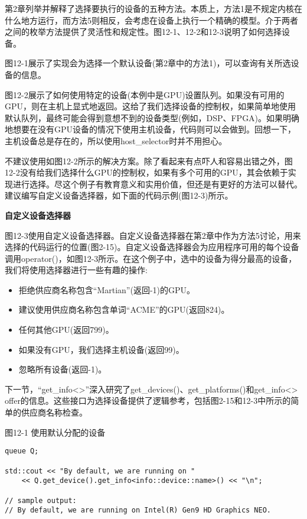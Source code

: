 第2章列举并解释了选择要执行的设备的五种方法。本质上，方法1是不规定内核在什么地方运行，而方法5则相反，会考虑在设备上执行一个精确的模型。介于两者之间的枚举方法提供了灵活性和规定性。图12-1、12-2和12-3说明了如何选择设备。\par

图12-1展示了实现会为选择一个默认设备(第2章中的方法1)，可以查询有关所选设备的信息。\par

图12-2展示了如何使用特定的设备(本例中是GPU)设置队列。如果没有可用的GPU，则在主机上显式地返回。这给了我们选择设备的控制权，如果简单地使用默认队列，最终可能会得到意想不到的设备类型(例如，DSP、FPGA)。如果明确地想要在没有GPU设备的情况下使用主机设备，代码则可以会做到。回想一下，主机设备总是存在的，所以使用host\_selector时并不用担心。\par

不建议使用如图12-2所示的解决方案。除了看起来有点吓人和容易出错之外，图12-2没有给我们选择什么GPU的控制权，如果有多个可用的GPU，其会依赖于实现进行选择。尽这个例子有教育意义和实用价值，但还是有更好的方法可以替代。建议编写自定义设备选择器，如下面的代码示例(图12-3)所示。\par

\hspace*{\fill} \par %
\textbf{自定义设备选择器}

图12-3使用自定义设备选择器。自定义设备选择器在第2章中作为方法5讨论，用来选择的代码运行的位置(图2-15)。自定义设备选择器会为应用程序可用的每个设备调用operator()，如图12-3所示。在这个例子中，选中的设备为得分最高的设备，我们将使用选择器进行一些有趣的操作:\par

\begin{itemize}
	\item 拒绝供应商名称包含“Martian”(返回-1)的GPU。
	\item 建议使用供应商名称包含单词“ACME”的GPU(返回824)。
	\item 任何其他GPU(返回799)。
	\item 如果没有GPU，我们选择主机设备(返回99)。
	\item 忽略所有设备(返回-1)。
\end{itemize}

下一节，“get\_info<>”深入研究了get\_devices()、get\_platforms()和get\_info<> offer的信息。这些接口为选择设备提供了逻辑参考，包括图2-15和12-3中所示的简单的供应商名称检查。\par

\hspace*{\fill} \par %
图12-1 使用默认分配的设备
\begin{lstlisting}[caption={}]
queue Q;

std::cout << "By default, we are running on "
	<< Q.get_device().get_info<info::device::name>() << "\n";

// sample output:
// By default, we are running on Intel(R) Gen9 HD Graphics NEO.
\end{lstlisting}


